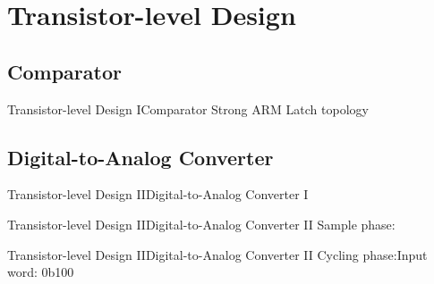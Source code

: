 \documentclass{beamer}
\begin{document}
 \section{Transistor-level Design}
 \subsection{Comparator}
 \begin{frame}{Transistor-level Design I}{Comparator}
  Strong ARM Latch topology\par\vspace{1em}
  \resizebox{\textwidth}{!}{\centering}
 \end{frame}
 \subsection{Digital-to-Analog Converter}
 \begin{frame}{Transistor-level Design II}{Digital-to-Analog Converter I}
  \centering
 \end{frame}

 \begin{frame}{Transistor-level Design II}{Digital-to-Analog Converter II}
  Sample phase:
  \vspace*{1em}
  \begin{center}
   
  \end{center}
 \end{frame}

 \begin{frame}{Transistor-level Design II}{Digital-to-Analog Converter II}
  Cycling phase:\hfill Input word: \alert{0b100}
  \vspace*{1em}
  \begin{center}
   
  \end{center}
 \end{frame}
\end{document}
